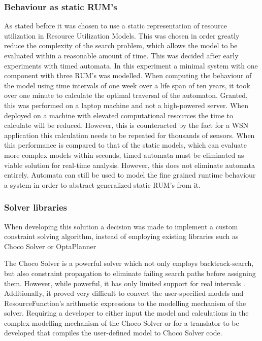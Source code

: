 \subsubsection{Behaviour as static RUM's}
As stated before it was chosen to use a static representation of resource utilization in Resource Utilization Models. This was chosen in order greatly reduce the complexity of the search problem, which allows the model to be evaluated within a reasonable amount of time. This was decided after early experiments with timed automata. In this experiment a minimal system with one component with three RUM's was modelled. When computing the behaviour of the model using time intervals of one week over a life span of ten years, it took over one minute to calculate the optimal traversal of the automaton. Granted, this was performed on a laptop machine and not a high-powered server. When deployed on a machine with elevated computational resources the time to calculate will be reduced. However, this is counteracted by the fact for a WSN application this calculation needs to be repeated for thousands of sensors. When this performance is compared to that of the static models, which can evaluate more complex models within seconds, timed automata must be eliminated as viable solution for real-time analysis. However, this does not eliminate automata entirely. Automata can still be used to model the fine grained runtime behaviour a system in order to abstract generalized static RUM's from it.

\subsubsection{Solver libraries}
When developing this solution a decision was made to implement a custom constraint solving algorithm, instead of employing existing libraries such as Choco Solver \cite{web:choco} or OptaPlanner \cite{web:opta}

The Choco Solver is a powerful solver which not only employs backtrack-search, but also constraint propagation to eliminate failing search paths before assigning them. However, while powerful, it has only limited support for real intervals \cite{choco_ibex}. Additionally, it proved very difficult to convert the user-specified models and ResourceFunction's arithmetic expressions to the modelling mechanism of the solver. Requiring a developer to either input the model and calculations in the complex modelling mechanism of the Choco Solver or for a translator to be developed that compiles the user-defined model to Choco Solver code.

